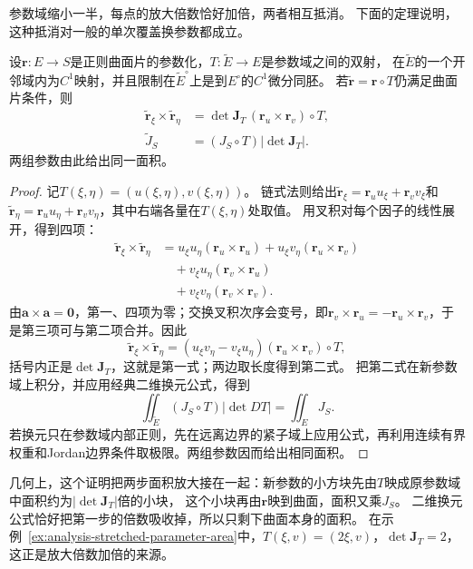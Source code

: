 参数域缩小一半，每点的放大倍数恰好加倍，两者相互抵消。
下面的定理说明，这种抵消对一般的单次覆盖换参数都成立。

\begin{theorem}[重参数化下的面积元]
\label{thm:analysis-surface-reparameterization}
设$\bm r:E\to S$是正则曲面片的参数化，$T:\widetilde E\to E$是参数域之间的双射，
在$\widetilde E$的一个开邻域内为$C^1$映射，并且限制在$\widetilde E^\circ$上是到$E^\circ$的$C^1$微分同胚。
若$\widetilde{\bm r}=\bm r\circ T$仍满足曲面片条件，则
\[
 \begin{aligned}
 \widetilde{\bm r}_\xi\times\widetilde{\bm r}_\eta
 &=\det\bm J_T\,(\bm r_u\times\bm r_v)\circ T,\\
 \widetilde J_S&=(J_S\circ T)|\det\bm J_T|.
 \end{aligned}
\]
两组参数由此给出同一面积。
\end{theorem}

\begin{proof}
记$T(\xi,\eta)=(u(\xi,\eta),v(\xi,\eta))$。
链式法则给出$\widetilde{\bm r}_\xi=\bm r_u u_\xi+\bm r_v v_\xi$和
$\widetilde{\bm r}_\eta=\bm r_u u_\eta+\bm r_v v_\eta$，其中右端各量在$T(\xi,\eta)$处取值。
用叉积对每个因子的线性展开，得到四项：
\[
 \begin{aligned}
 \widetilde{\bm r}_\xi\times\widetilde{\bm r}_\eta
 &=u_\xi u_\eta(\bm r_u\times\bm r_u)+u_\xi v_\eta(\bm r_u\times\bm r_v)\\
 &\quad{}+v_\xi u_\eta(\bm r_v\times\bm r_u)\\
 &\quad{}+v_\xi v_\eta(\bm r_v\times\bm r_v).
 \end{aligned}
\]
由$\bm a\times\bm a=\bm0$，第一、四项为零；交换叉积次序会变号，即$\bm r_v\times\bm r_u=-\bm r_u\times\bm r_v$，于是第三项可与第二项合并。因此
\[
 \widetilde{\bm r}_\xi\times\widetilde{\bm r}_\eta
 =(u_\xi v_\eta-v_\xi u_\eta)(\bm r_u\times\bm r_v)\circ T,
\]
括号内正是$\det\bm J_T$，这就是第一式；两边取长度得到第二式。
把第二式在新参数域上积分，并应用经典二维换元公式，得到
\[
 \iint_{\widetilde E}(J_S\circ T)|\det DT|
 =\iint_E J_S.
\]
若换元只在参数域内部正则，先在远离边界的紧子域上应用公式，再利用连续有界权重和Jordan边界条件取极限。两组参数因而给出相同面积。
\end{proof}

几何上，这个证明把两步面积放大接在一起：新参数的小方块先由$T$映成原参数域中面积约为$|\det\bm J_T|$倍的小块，
这个小块再由$\bm r$映到曲面，面积又乘$J_S$。
二维换元公式恰好把第一步的倍数吸收掉，所以只剩下曲面本身的面积。
在示例~\ref{ex:analysis-stretched-parameter-area}中，$T(\xi,v)=(2\xi,v)$，$\det\bm J_T=2$，这正是放大倍数加倍的来源。

